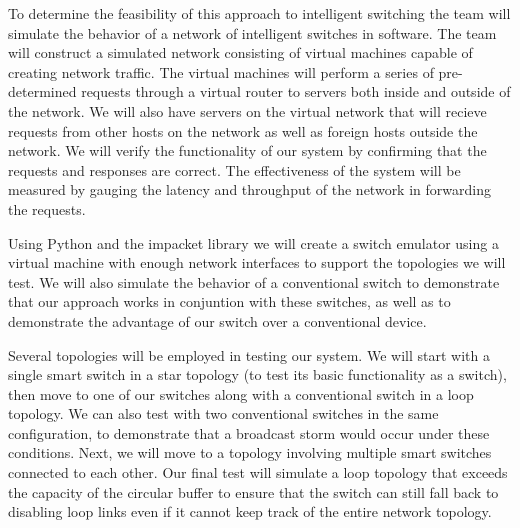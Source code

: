 \documentclass{article}
\begin{document}
	To determine the feasibility of this approach to intelligent switching the team will simulate the behavior of a network of intelligent switches in software.
	The team will construct a simulated network consisting of virtual machines capable of creating network traffic.
	The virtual machines will perform a series of pre-determined requests through a virtual router to servers both inside and outside of the network.
	We will also have servers on the virtual network that will recieve requests from other hosts on the network as well as foreign hosts outside the network.
	We will verify the functionality of our system by confirming that the requests and responses are correct.
	The effectiveness of the system will be measured by gauging the latency and throughput of the network in forwarding the requests.
	
	Using Python and the impacket library we will create a switch emulator using a virtual machine with enough network interfaces to support the topologies we will test.
	We will also simulate the behavior of a conventional switch to demonstrate that our approach works in conjuntion with these switches, as well as to demonstrate the advantage of our switch over a conventional device.
	
	Several topologies will be employed in testing our system.
	We will start with a single smart switch in a star topology (to test its basic functionality as a switch), then move to one of our switches along with a conventional switch in a loop topology.
	We can also test with two conventional switches in the same configuration, to demonstrate that a broadcast storm would occur under these conditions.
	Next, we will move to a topology involving multiple smart switches connected to each other.
	Our final test will simulate a loop topology that exceeds the capacity of the circular buffer to ensure that the switch can still fall back to disabling loop links even if it cannot keep track of the entire network topology.
\end{document}
